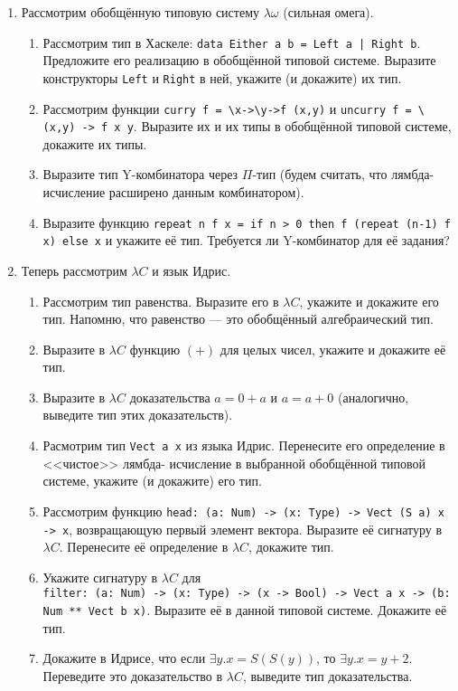 \documentclass[10pt,a4paper,oneside]{article}
\begin{document}
\begin{enumerate}
\item Рассмотрим обобщённую типовую систему $\lambda\omega$ (сильная омега).
\begin{enumerate}
\item Рассмотрим тип в Хаскеле: \verb!data Either a b = Left a | Right b!.
Предложите его реализацию в обобщённой типовой системе. 
Выразите конструкторы \verb!Left! и \verb!Right! в ней, укажите (и докажите) их тип.
\item Рассмотрим функции \verb!curry f = \x->\y->f (x,y)! и 
\verb!uncurry f = \(x,y) -> f x y!. Выразите их и их типы в обобщённой типовой системе, докажите их типы.
\item Выразите тип Y-комбинатора через $\Pi$-тип (будем считать, что лямбда-исчисление
расширено данным комбинатором).
\item Выразите функцию \verb!repeat n f x = if n > 0 then f (repeat (n-1) f x) else x!
и укажите её тип. Требуется ли Y-комбинатор для её задания?
\end{enumerate}

\item Теперь рассмотрим $\lambda C$ и язык Идрис.
\begin{enumerate}
\item Рассмотрим тип равенства. Выразите его в $\lambda C$, укажите и докажите его тип.
Напомню, что равенство --- это обобщённый алгебраический тип.
\item Выразите в $\lambda C$ функцию $(+)$ для целых чисел, укажите и докажите её тип.
\item Выразите в $\lambda C$ доказательства $a = 0+a$ и $a = a + 0$ (аналогично, выведите тип этих
доказательств).
\item Расмотрим тип \verb!Vect a x! из языка Идрис. Перенесите его определение в <<чистое>> лямбда-
исчисление в выбранной обобщённой типовой системе, укажите (и докажите) его тип.
\item Рассмотрим функцию \verb!head: (a: Num) -> (x: Type) -> Vect (S a) x -> x!, возвращающую
первый элемент вектора. Выразите её сигнатуру в $\lambda C$. Перенесите её определение в $\lambda C$,
докажите тип.
\item Укажите сигнатуру в $\lambda C$ для\\
\verb!filter: (a: Num) -> (x: Type) -> (x -> Bool) -> Vect a x -> (b: Num ** Vect b x)!.
Выразите её в данной типовой системе. Докажите её тип.
\item Докажите в Идрисе, что если $\exists y.x = S(S(y))$, то $\exists y.x = y + 2$.
Переведите это доказательство в $\lambda C$, выведите тип доказательства.
\end{enumerate}
\end{enumerate}
\end{document}
